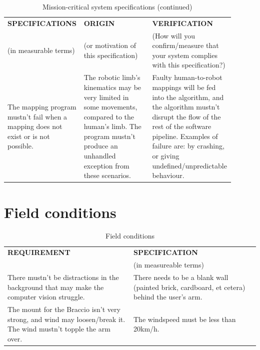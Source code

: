 \newpage
\begin{table}[h!]
\center
\begin{tabular}{|p{0.3\linewidth}|p{0.3\linewidth}|p{0.3\linewidth}|}
    \hline
    \textbf{SPECIFICATIONS} & \textbf{ORIGIN} & \textbf{VERIFICATION} \\
    (in measurable terms) & (or motivation of this specification) & (How will you confirm/measure that your system complies with this specification?) \\
    \hline
    The mapping program mustn't fail when a mapping does not exist or is not possible. & The robotic limb's kinematics may be very limited in some movements, compared to the human's limb. The program mustn't produce an unhandled exception from these scenarios. & Faulty human-to-robot mappings will be fed into the algorithm, and the algorithm mustn't disrupt the flow of the rest of the software pipeline. Examples of failure are: by crashing, or giving undefined/unpredictable behaviour. \\
    \hline
\end{tabular}
\caption{Mission-critical system specifications (continued)}
\end{table}

\section{Field conditions}
\label{sec:field_conditions}

\begin{table}[h!]
\center
\begin{tabular}{|p{0.5\linewidth}|p{0.5\linewidth}|}
    \hline
    \textbf{REQUIREMENT} & \textbf{SPECIFICATION} \\
    & (in measureable terms) \\
    \hline
    There mustn't be distractions in the background that may make the computer vision struggle. & There needs to be a blank wall (painted brick, cardboard, et cetera) behind the user's arm. \\
    \hline
    The  mount for the Braccio isn't very strong, and wind may loosen/break it. The wind mustn't topple the arm over. & The windspeed must be less than 20km/h. \\
    \hline
\end{tabular}
\caption{Field conditions}
\end{table}

